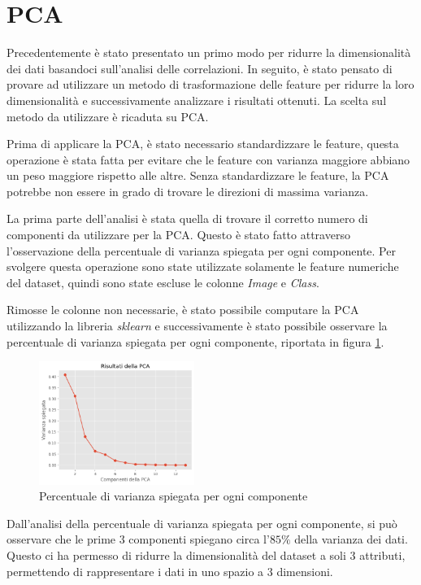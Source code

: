 \section{PCA} \label{sec:pca}
Precedentemente è stato presentato un primo modo per ridurre la dimensionalità
dei dati basandoci sull'analisi delle correlazioni. In seguito, è stato pensato
di provare ad utilizzare un metodo di trasformazione delle feature per ridurre
la loro dimensionalità e successivamente analizzare i risultati ottenuti. La
scelta sul metodo da utilizzare è ricaduta su PCA.

Prima di applicare la PCA, è stato necessario standardizzare le feature, questa
operazione è stata fatta per evitare che le feature con varianza maggiore abbiano
un peso maggiore rispetto alle altre. Senza standardizzare le feature, la PCA
potrebbe non essere in grado di trovare le direzioni di massima varianza.

La prima parte dell'analisi è stata quella di trovare il corretto numero di
componenti da utilizzare per la PCA. Questo è stato fatto attraverso
l'osservazione della percentuale di varianza spiegata per ogni componente. Per
svolgere questa operazione sono state utilizzate solamente le feature numeriche
del dataset, quindi sono state escluse le colonne \textit{Image} e \textit{Class}.

Rimosse le colonne non necessarie, è stato possibile computare la PCA utilizzando
la libreria \textit{sklearn} e successivamente è stato possibile osservare la
percentuale di varianza spiegata per ogni componente, riportata in figura \ref{fig:pca}.

\begin{figure}[!ht]
      \centering
      \includegraphics[width=0.45\textwidth]{img/analisi/pcaVarianza.png}
      \caption{Percentuale di varianza spiegata per ogni componente}
      \label{fig:pca}
\end{figure}

Dall'analisi della percentuale di varianza spiegata per ogni componente, si può
osservare che le prime $3$ componenti spiegano circa l'$85\%$ della varianza
dei dati. Questo ci ha permesso di ridurre la dimensionalità del dataset a soli
$3$ attributi, permettendo di rappresentare i dati in uno spazio a $3$ dimensioni.

